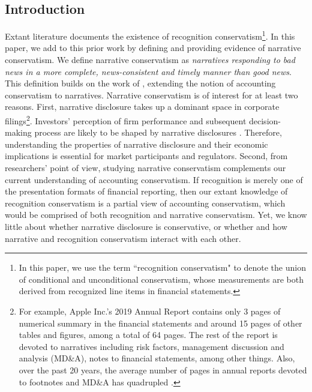 \documentclass[a4paper]{article}
\begin{document}
\begin{spacing}{2}
\clearpage

\setcounter{page}{1}
\section{Introduction}
Extant literature documents the existence of recognition conservatism\footnote{In this paper, we use the term ``recognition conservatism" to denote the union of conditional and unconditional conservatism, whose measurements are both derived from recognized line items in financial statements.}. In this paper, we add to this prior work by defining and providing evidence of narrative conservatism. We define narrative conservatism as \textit{narratives responding to bad news in a more complete, news-consistent and timely manner than good news}. This definition builds on the work of \citet*{basuConservatismPrincipleAsymmetric1997}, extending the notion of accounting conservatism to narratives. Narrative conservatism is of interest for at least two reasons. First, narrative disclosure takes up a dominant space in corporate filings\footnote{For example, Apple Inc.'s 2019 Annual Report contains only 3 pages of numerical summary in the financial statements and around 15 pages of other tables and figures, among a total of 64 pages. The rest of the report is devoted to narratives including risk factors, management discussion and analysis (MD\&A), notes to financial statements, among other things. Also, over the past 20 years, the average number of pages in annual reports devoted to footnotes and MD\&A has quadrupled \citep{eyPointNowTime2012}.}. Investors' perception of firm performance and subsequent decision-making process are likely to be shaped by narrative disclosures \citep*{liTextualAnalysisCorporate2010}. Therefore, understanding the properties of narrative disclosure and their economic implications is essential for market participants and regulators. Second, from researchers' point of view, studying narrative conservatism complements our current understanding of accounting conservatism. If recognition is merely one of the presentation formats of financial reporting, then our extant knowledge of recognition conservatism is a partial view of accounting conservatism, which would be comprised of both recognition and narrative conservatism. Yet, we know little about whether narrative disclosure is conservative, or whether and how narrative and recognition conservatism interact with each other.


\end{spacing}
\end{document}
